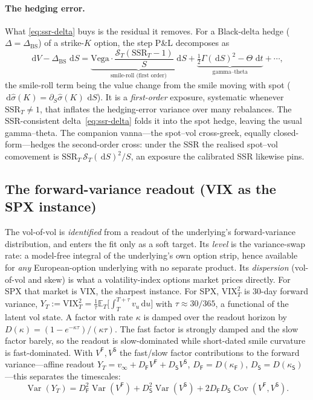 \documentclass[11pt]{article}
\newcommand{\BS}{\operatorname{BS}}
\newcommand{\E}{\mathbb{E}}
\newcommand{\Var}{\operatorname{Var}}
\newcommand{\Cov}{\operatorname{Cov}}
\newcommand{\SSR}{\mathrm{SSR}}
\newcommand{\VIX}{\mathrm{VIX}}
\newcommand{\dd}{\,\mathrm{d}}
\begin{document}
\paragraph{The hedging error.} What \eqref{eq:ssr-delta} buys is the residual it removes. For a
Black-delta hedge ($\Delta=\Delta_{\BS}$) of a strike-$K$ option, the step P\&L decomposes as
\begin{equation}
\dd V-\Delta_{\BS}\,\dd S=\underbrace{\mathrm{Vega}\cdot\frac{\mathcal S_T(\SSR_T-1)}{S}\,\dd S}_{\text{smile-roll (first order)}}
+\underbrace{\tfrac12\Gamma(\dd S)^2-\Theta\,\dd t}_{\text{gamma--theta}}+\cdots,
\label{eq:hedge-pnl}
\end{equation}
the smile-roll term being the value change from the smile moving with spot
($\dd\widehat\sigma(K)=\partial_S\widehat\sigma(K)\,\dd S$). It is a \emph{first-order} exposure,
systematic whenever $\SSR_T\ne1$, that inflates the hedging-error variance over many rebalances.
The SSR-consistent delta~\eqref{eq:ssr-delta} folds it into the spot hedge, leaving the usual
gamma--theta. The companion vanna---the spot--vol cross-greek, equally closed-form---hedges the
second-order cross: under the SSR the realised spot--vol comovement is $\SSR_T\,\mathcal S_T(\dd S)^2/S$,
an exposure the calibrated SSR likewise pins.

\subsection{The forward-variance readout (VIX as the SPX instance)}
The vol-of-vol is \emph{identified} from a readout of the underlying's forward-variance
distribution, and enters the fit only as a soft target. Its \emph{level} is the variance-swap
rate: a model-free integral of the underlying's own option strip, hence available for
\emph{any} European-option underlying with no separate product. Its \emph{dispersion}
(vol-of-vol and skew) is what a volatility-index options market prices directly. For SPX that
market is VIX, the sharpest instance. For SPX, $\VIX_T^2$ is $30$-day forward variance,
$Y_T:=\VIX_T^2=\tfrac1\tau\E_T\!\big[\int_T^{T+\tau}v_u\dd u\big]$ with $\tau\approx 30/365$,
a functional of the latent vol state. A factor with rate $\kappa$ is damped over the readout
horizon by $D(\kappa)=(1-e^{-\kappa\tau})/(\kappa\tau)$. The fast factor is strongly damped
and the slow factor barely, so the readout is slow-dominated while short-dated smile curvature
is fast-dominated. With $V^{\mathsf F},V^{\mathsf S}$ the fast/slow factor contributions to the
forward variance---affine readout $Y_T=v_\infty+D_{\mathsf F}V^{\mathsf F}+D_{\mathsf S}V^{\mathsf S}$,
$D_{\mathsf F}=D(\kappa_{\mathsf F})$, $D_{\mathsf S}=D(\kappa_{\mathsf S})$---this separates the timescales:
\begin{equation}
\Var(Y_T)=D_{\mathsf F}^2\Var(V^{\mathsf F})+D_{\mathsf S}^2\Var(V^{\mathsf S})+2D_{\mathsf F}D_{\mathsf S}\Cov(V^{\mathsf F},V^{\mathsf S}).
\label{eq:vix-var}
\end{equation}
\end{document}
